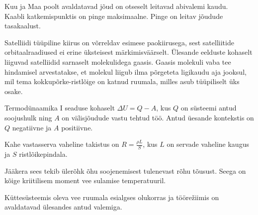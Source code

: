 \documentclass[10pt, twoside]{article}
\begin{document}
{
\hint
\osa Kuu ja Maa poolt avaldatavad jõud on otseselt leitavad abivalemi kaudu.\\
\osa Kaabli katkemispunktis on pinge maksimaalne. Pinge on leitav jõudude tasakaalust.
\probend
\bigskip


\hint
Satelliidi tüüpiline kiirus on võrreldav esimese paokiirusega, sest satelliitide orbitaalraadiused ei erine üksteisest märkimisväärselt. Ülesande eelduste kohaselt liiguvad satelliidid sarnaselt molekulidega gaasis. Gaasis molekuli vaba tee hindamisel arvestatakse, et molekul liigub ilma põrgeteta ligikaudu aja jooksul, mil tema kokkupõrke-ristlõige on katnud ruumala, milles asub tüüpiliselt üks osake.
\probend
\bigskip


\hint
Termodünaamika I seaduse kohaselt $\Delta U = Q - A$, kus $Q$ on süsteemi antud soojushulk ning $A$ on välisjõudude vastu tehtud töö. Antud üesande kontekstis on $Q$ negatiivne ja $A$ positiivne.
\probend
\bigskip


\hint
Kahe vastasserva vaheline takistus on $R = \frac{\rho L}{S}$, kus $L$ on servade vaheline kaugus ja $S$ ristlõikepindala.
\probend
\bigskip


\hint
Jääkera sees tekib ülerõhk õhu soojenemisest tulenevast rõhu tõusust. Seega on kõige kriitilisem moment vee sulamise temperatuuril.
\probend
\bigskip


\hint
Küttesüsteemis oleva vee ruumala esialgses olukorras ja töörežiimis on avaldatavad ülesandes antud valemiga.
\probend
\bigskip


}
\end{document}

